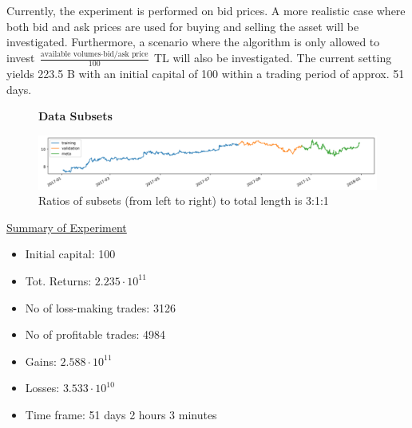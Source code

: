 \documentclass{article}
\begin{document}
Currently, the experiment is performed on bid prices. A more realistic case where both bid and ask prices are used for buying and selling the asset will be investigated. Furthermore, a scenario where the algorithm is only allowed to invest $\frac{\text{available volumes} \cdot \text{bid/ask price}}{100}$ TL will also be investigated. The current setting yields 223.5 B with an initial capital of 100 within a trading period of approx. 51 days.
\clearpage

\begin{figure}[!htbp]
     \centering
     \textbf{Data Subsets}\par\medskip
     \includegraphics[scale=0.48]{data_split.png}
     \caption{Ratios of subsets (from left to right) to total length is 3:1:1}
     \label{fig::data_split}
\end{figure}

\begin{center}
    \underline{Summary of Experiment}
    \begin{itemize}
        \item Initial capital: 100
        \item Tot. Returns: $2.235 \cdot 10^{11}$
        \item No of loss-making trades: 3126
        \item No of profitable trades: 4984
        \item Gains: $2.588 \cdot 10^{11}$
        \item Losses: $3.533 \cdot 10^{10}$
        \item Time frame: 51 days 2 hours 3 minutes
    \end{itemize}
\end{center}
\end{document}

